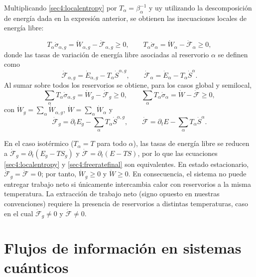 Multiplicando \eqref{sec4:localentropy} por $T_{\alpha}=\beta_{\alpha}^{-1}$ y uy utilizando la descomposición de energía dada en la expresión anterior, se obtienen las inecuaciones locales de energía libre:

\begin{equation}
    T_{\alpha}\dot{\sigma}_{\alpha,g}
    = \dot{W}_{\alpha,g}-\dot{\mathcal{F}}_{\alpha,g}\ge 0,
    \qquad
    T_{\alpha}\dot{\sigma}_{\alpha}
    = \dot{W}_{\alpha}-\dot{\mathcal{F}}_{\alpha}\ge 0,
    \label{sec4:localfreerate}
\end{equation}
donde las tasas de variación de energía libre asociadas al reservorio $\alpha$ se definen como
\[
\dot{\mathcal{F}}_{\alpha,g}
= \dot{E}_{\alpha,g}-T_{\alpha}\dot{S}^{\alpha,g},
\qquad
\dot{\mathcal{F}}_{\alpha}
= \dot{E}_{\alpha}-T_{\alpha}\dot{S}^{\alpha}.
\]
Al sumar sobre todos los reservorios se obtiene, para los casos global y semilocal,
\begin{equation}
    \sum_{\alpha}T_{\alpha}\dot{\sigma}_{\alpha,g}
    = \dot{W}_{g}-\dot{\mathcal{F}}_{g}\ge 0,
    \qquad
    \sum_{\alpha}T_{\alpha}\dot{\sigma}_{\alpha}
    = \dot{W}-\dot{\mathcal{F}}\ge 0,
    \label{sec4:freeratefinal}
\end{equation}
con $\dot{W}_{g}=\sum_{\alpha}\dot{W}_{\alpha,g}$,
$\dot{W}=\sum_{\alpha}\dot{W}_{\alpha}$ y
\[
\dot{\mathcal{F}}_{g}
=\partial_{t}E_{g}-\sum_{\alpha}T_{\alpha}\dot{S}^{\alpha,g},
\qquad
\dot{\mathcal{F}}
=\partial_{t}E-\sum_{\alpha}T_{\alpha}\dot{S}^{\alpha}.
\]

En el caso isotérmico ($T_{\alpha}=T$ para todo $\alpha$), las tasas de energía libre se reducen a
$\dot{\mathcal{F}}_{g}=\partial_{t}(E_{g}-TS_{g})$ y
$\dot{\mathcal{F}}=\partial_{t}(E-TS)$, por lo que las ecuaciones
\eqref{sec4:localentropy} y \eqref{sec4:freeratefinal} son equivalentes. En estado estacionario,
$\dot{\mathcal{F}}_{g}=\dot{\mathcal{F}}=0$; por tanto,
$\dot{W}_{g}\ge 0$ y $\dot{W}\ge 0$. En consecuencia, el sistema no puede entregar trabajo neto si únicamente intercambia calor con reservorios a la misma temperatura. La extracción de trabajo neto (signo opuesto en nuestras convenciones) requiere la presencia de reservorios a distintas temperaturas, caso en el cual $\dot{\mathcal{F}}_{g}\neq 0$ y $\dot{\mathcal{F}}\neq 0$.


\section{Flujos de información en sistemas cuánticos}

